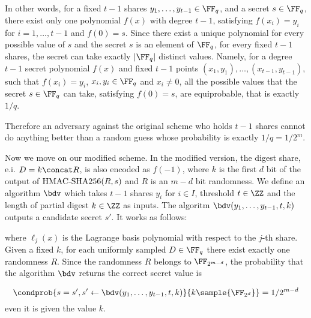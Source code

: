 \documentclass[envcountsame,runningheads,notitlepage]{llncs}
\begin{document}
	In other words, for a fixed $t-1$ shares $y_1, \ldots, y_{t-1} \in \FF_q$, and a secret $s \in \FF_q$, there exist only one polynomial $f(x)$ with degree $t-1$, satisfying $f(x_i) = y_i$ for $i = 1, \ldots, t-1$ and $f(0) = s$.
	Since there exist a unique polynomial for every possible value of $s$ and the secret $s$ is an element of $\FF_q$, for every fixed $t-1$ shares, the secret can take exactly $|\FF_q|$ distinct values. 
	Namely, for a  degree $t - 1$ secret polynomial $f(x)$ and fixed $t-1$ points $(x_1, y_1), \ldots, (x_{t-1}, y_{t-1})$, such that $f(x_i) = y_i$, $x_i, y_i \in \FF_q$ and $x_i \neq 0$, all the possible values that the secret $s \in \FF_q$ can take, satisfying $f(0) = s$, are equiprobable, that is exactly $1/q$.  
	 
	Therefore an adversary against the original scheme who holds $t-1$ shares cannot do anything better than a random guess whose probability is exactly $1/q = 1/2^m$.
	
	Now we move on our modified scheme. 	
	In the modified version, the digest share, e.i. $D = k \concat R$, is also encoded as $f(-1)$, where  $k$ is the first $d$ bit of the output of ${\textrm{HMAC-SHA256}}(R, s)$ and $R$ is an $m - d$ bit randomness. 
	We define an algorithm $\bdv$ which takes $t-1$ shares $y_i$ for $i \in I$, threshold $t \in \ZZ$ and the length of partial digest $k \in \ZZ$ as inputs.
	The algoritm $\bdv(y_1, \ldots, y_{t-1}, t, k)$ outputs a candidate secret $s'$. It works as follows:
	
	where $\ell_{j}(x)$ is the  Lagrange basis polynomial with respect to the $j$-th share.
	Given a fixed $k$, for each uniformly sampled $D \in \FF_q$ there exist exactly one randomness $R$.  
	Since the randomness $R$ belongs to $\FF_{2^{m - d}}$, the probability that the algorithm $\bdv$ returns the correct secret value is 
	
	\begin{equation*}
		\condprob{s = s', s' \leftarrow \bdv(y_1, \ldots, y_{t-1}, t, k)}{k \sample {\FF_{2^d}}} = 1/2^{m - d}
	\end{equation*}
	even it is given the value $k$.
	
	
	
	
	
\end{document}
